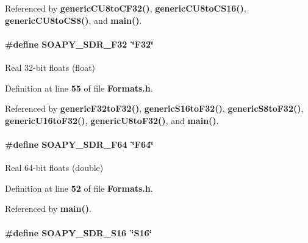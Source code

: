 Referenced by {\bf generic\+C\+U8to\+C\+F32()}, {\bf generic\+C\+U8to\+C\+S16()}, {\bf generic\+C\+U8to\+C\+S8()}, and {\bf main()}.

\paragraph[{S\+O\+A\+P\+Y\+\_\+\+S\+D\+R\+\_\+\+F32}]{\setlength{\rightskip}{0pt plus 5cm}\#define S\+O\+A\+P\+Y\+\_\+\+S\+D\+R\+\_\+\+F32~\char`\"{}F32\char`\"{}}\label{Formats_8h_a20025b52551864e9b96b613b0e4a74d1}


Real 32-\/bit floats (float) 



Definition at line {\bf 55} of file {\bf Formats.\+h}.



Referenced by {\bf generic\+F32to\+F32()}, {\bf generic\+S16to\+F32()}, {\bf generic\+S8to\+F32()}, {\bf generic\+U16to\+F32()}, {\bf generic\+U8to\+F32()}, and {\bf main()}.

\paragraph[{S\+O\+A\+P\+Y\+\_\+\+S\+D\+R\+\_\+\+F64}]{\setlength{\rightskip}{0pt plus 5cm}\#define S\+O\+A\+P\+Y\+\_\+\+S\+D\+R\+\_\+\+F64~\char`\"{}F64\char`\"{}}\label{Formats_8h_a00bfa30c2e908485fcb41c7619d64eba}


Real 64-\/bit floats (double) 



Definition at line {\bf 52} of file {\bf Formats.\+h}.



Referenced by {\bf main()}.

\paragraph[{S\+O\+A\+P\+Y\+\_\+\+S\+D\+R\+\_\+\+S16}]{\setlength{\rightskip}{0pt plus 5cm}\#define S\+O\+A\+P\+Y\+\_\+\+S\+D\+R\+\_\+\+S16~\char`\"{}S16\char`\"{}}\label{Formats_8h_a94f8c27425ab6f3307edf7cebf2c52ba}


